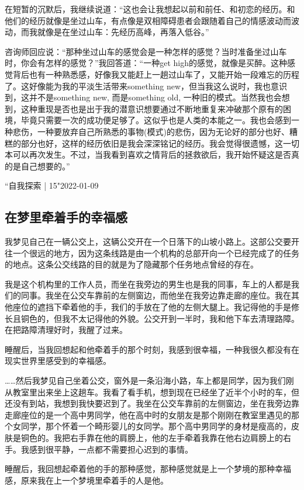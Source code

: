 在短暂的沉默后，我继续说道：“这也会让我想起以前和前任、和初恋的经历。和他们的经历就像是坐过山车，有点像是双相障碍患者会跟随着自己的情感波动而波动，而我就像是在坐过山车：先经历高峰，再落入低谷。”

咨询师回应说：“那种坐过山车的感觉会是一种怎样的感觉？当时准备坐过山车时，你会有怎样的感觉？”我回答道：“一种get high的感觉，就像是买醉。这种感觉背后也有一种熟悉感，好像我又能赶上一趟过山车了，又能开始一段难忘的历程了。这好像能为我的平淡生活带来something new，但当我这么说时，我也意识到，这并不是something new, 而是something old, 一种旧的模式。当然我也会想到，这种重现是否也是出于我的潜意识想要通过不断地重复来冲破那个原有的困境，毕竟只需要一次的成功便足够了。这似乎也是人类的本能之一。我也会感到一种悲伤，一种要放弃自己所熟悉的事物(模式)的悲伤，因为无论好的部分也好、糟糕的部分也好，这样的经历依旧是我会深深铭记的经历。我会觉得很遗憾，这一切本可以再次发生。不过，当我看到喜欢之情背后的拯救欲后，我开始怀疑这是否真的是自己想要的。”

\pozhehao{}“自我探索 | 15"2022-01-09


\subsection*{在梦里牵着手的幸福感}

我梦见自己在一辆公交上，这辆公交开在一个日落下的山坡小路上。这部公交要开往一个很远的地方，因为这条线路是由一个机构的总部开向一个已经完成了的任务的地点。这条公交线路的目的就是为了隐藏那个任务地点曾经的存在。

我是这个机构里的工作人员，而坐在我旁边的男生也是我的同事，车上的人都是我们的同事。我坐在公交车靠前的左侧窗边，而他坐在我旁边靠走廊的座位。我在其他座位的遮挡下牵着他的手，我们的手放在了他的左侧大腿上。我记得他的手是修长且铜色的，但我不太记得他的外貌。公交开到一半时，我和他下车去清理路障。在把路障清理好时，我醒了过来。

睡醒后，当我回想起和他牵着手的那个时刻，我感到很幸福，一种我很久都没有在现实世界里感受到的幸福感。

……然后我梦见自己坐着公交，窗外是一条沿海小路，车上都是同学，因为我们刚从教室里出来坐上这趟车。我看了看手机，想到现在已经坐了近半个小时的车，但还没有到站，我想到我快要迟到了。我坐在公交车靠前的左侧窗边，坐在我旁边靠走廊座位的是一个高中男同学，他在高中时的女朋友是那个刚刚在教室里遇见的那个女同学，那个怀着一个畸形婴儿的女同学。那个高中男同学的身材是瘦高的，皮肤是铜色的。我把右手靠在他的肩膀上，他的左手牵着我靠在他右边肩膀上的右手。我感到很平静，一点都不需要担心迟到的事情。

睡醒后，我回想起牵着他的手的那种感觉，那种感觉就是上一个梦境的那种幸福感，原来我在上一个梦境里牵着手的人是他。

